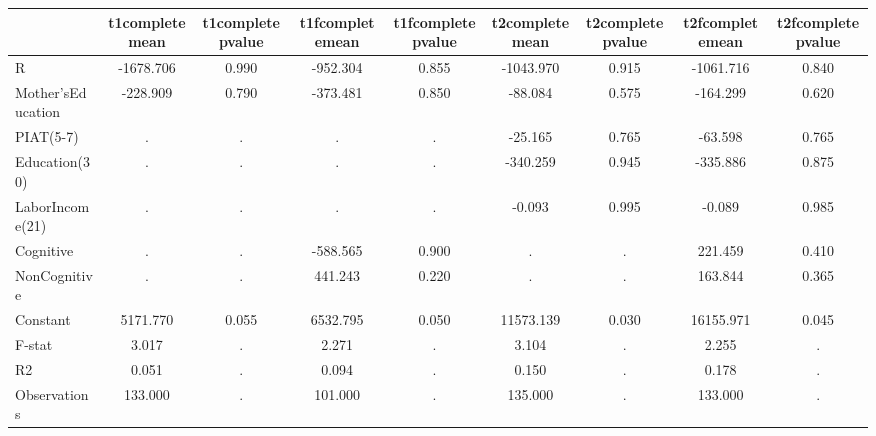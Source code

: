 \begin{table}[htbp]
\begin{tabular}{lcccccccc} \hline \hline
 & t1completemean  & t1completepvalue  & t1fcompletemean  & t1fcompletepvalue  & t2completemean  & t2completepvalue  & t2fcompletemean  & t2fcompletepvalue  \\  \hline 
R & -1678.706 &     0.990 &  -952.304 &     0.855 & -1043.970 &     0.915 & -1061.716 &     0.840 \\  
Mother'sEducation &  -228.909 &     0.790 &  -373.481 &     0.850 &   -88.084 &     0.575 &  -164.299 &     0.620 \\  
PIAT(5-7) &         . &         . &         . &         . &   -25.165 &     0.765 &   -63.598 &     0.765 \\  
Education(30) &         . &         . &         . &         . &  -340.259 &     0.945 &  -335.886 &     0.875 \\  
LaborIncome(21) &         . &         . &         . &         . &    -0.093 &     0.995 &    -0.089 &     0.985 \\  
Cognitive &         . &         . &  -588.565 &     0.900 &         . &         . &   221.459 &     0.410 \\  
NonCognitive &         . &         . &   441.243 &     0.220 &         . &         . &   163.844 &     0.365 \\  
Constant &  5171.770 &     0.055 &  6532.795 &     0.050 & 11573.139 &     0.030 & 16155.971 &     0.045 \\  
F-stat &     3.017 &         . &     2.271 &         . &     3.104 &         . &     2.255 &         . \\  
R2 &     0.051 &         . &     0.094 &         . &     0.150 &         . &     0.178 &         . \\  
Observations &   133.000 &         . &   101.000 &         . &   135.000 &         . &   133.000 &         . \\  
\hline \hline \end{tabular}
\end{table}

